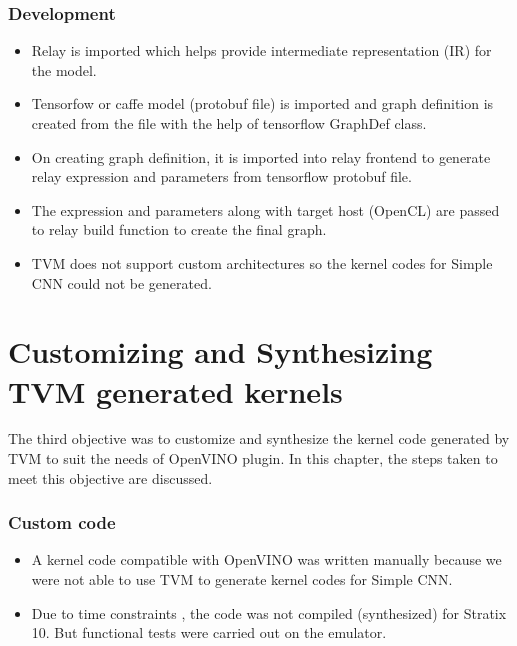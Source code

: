 \documentclass[titlepage]{report}
\begin{document}
\subsection{Development}
\begin{itemize}
    \item Relay is imported which helps provide intermediate representation (IR) for the model.
    \item Tensorfow or caffe model (protobuf file) is imported and graph definition is created from the file with the help of tensorflow GraphDef class.
    \item On creating graph definition, it is imported into relay frontend to generate relay expression and parameters from tensorflow protobuf file. 
    \item The expression and parameters along with target host (OpenCL) are passed to relay build function to create the final graph. 
    \item TVM does not support custom architectures so the kernel codes for Simple CNN could not be generated.
\end{itemize}




\chapter{ Customizing and Synthesizing TVM generated kernels}  
The third objective was to customize and synthesize the kernel code generated by TVM to suit the needs of OpenVINO plugin. In this chapter, the steps taken to meet this objective are discussed.
\subsection{Custom code}
\begin{itemize}
    \item  A kernel code compatible with OpenVINO was written manually because we were not able to use TVM to generate kernel codes for Simple CNN.
    \item Due to time constraints , the code was not compiled (synthesized) for Stratix 10. But functional tests were carried out on the emulator.
    
\end{itemize}
\end{document}
